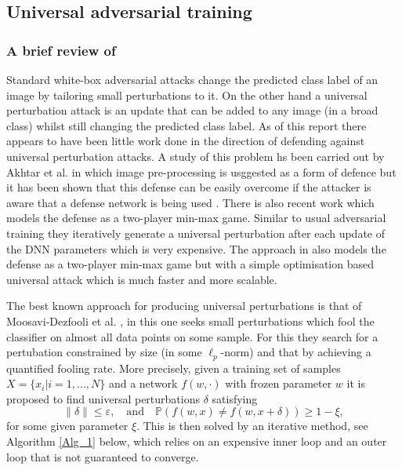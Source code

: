 \subsection{Universal adversarial training}

\subsubsection{A brief review of \cite{shafahi_universal_2018}}

Standard white-box adversarial attacks change the predicted class label of an image by tailoring small perturbations to it. On the other hand a universal perturbation attack is an update that can be added to any image (in a broad class) whilst still changing the predicted class label. As of this report there appears to have been little work done in the direction of defending against universal perturbation attacks. A study of this problem hs been carried out by Akhtar et al. \cite{akhtar_defense_2018} in which image pre-processing is usggested as a form of defence but it has been shown that this defense can be easily overcome if the attacker is aware that a defense network is being used \cite{carlini_adversarial_2017}. There is also recent work \cite{perolat_playing_2018} which models the defense as a two-player min-max game. Similar to usual adversarial training they iteratively generate a universal perturbation after each update of the DNN parameters which is very expensive. The approach in \cite{shafahi_universal_2018} also models the defense as a two-player min-max game but with a simple optimisation based universal attack which is much faster and more scalable.

The best known approach for producing universal perturbations is that of Moosavi-Dezfooli et al. \cite{moosavi-dezfooli_universal_2017}, in this one seeks small perturbations which fool the classifier on almost all data points on some sample. For this they search for a pertubation constrained by size (in some $\ell_p$-norm) and that by achieving a quantified fooling rate.  More precisely, given a training set of samples $X=\{ x_i | i=1,...,N \}$ and a network $f(w,\cdot)$ with frozen parameter $w$ it is proposed to find universal perturbations $\delta$ satisfying 
$$\| \delta \| \leq \varepsilon, \quad \text{and} \quad \mathbb{P}(f(w, x) \neq f(w, x + \delta)) \geq 1-\xi,$$
for some given parameter $\xi$. This is then solved by an iterative method, see Algorithm \ref{Alg_1} below, which relies on an expensive inner loop and an outer loop that is not guaranteed to converge.  


